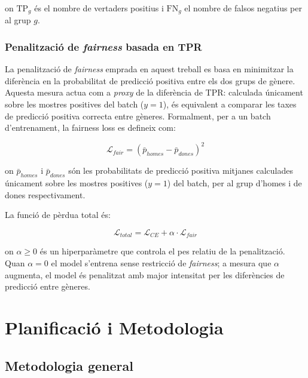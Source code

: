 \documentclass[a4paper,12pt,twoside]{ThesisStyle}
\begin{document}
\noindent on $\text{TP}_g$ és el nombre de vertaders positius i $\text{FN}_g$ el nombre de falsos negatius per al grup $g$.

\subsection{Penalització de \textit{fairness} basada en TPR}

La penalització de \textit{fairness} emprada en aquest treball es basa en minimitzar la diferència en la probabilitat de predicció positiva entre els dos grups de gènere. Aquesta mesura actua com a \textit{proxy} de la diferència de TPR: calculada únicament sobre les mostres positives del batch ($y=1$), és equivalent a comparar les taxes de predicció positiva correcta entre gèneres. Formalment, per a un batch d'entrenament, la fairness loss es defineix com:

\begin{equation}
    \mathcal{L}_{fair} = \left( \bar{p}_{homes} - \bar{p}_{dones} \right)^2
    \label{equ:fairloss}
\end{equation}

\noindent on $\bar{p}_{homes}$ i $\bar{p}_{dones}$ són les probabilitats de predicció positiva mitjanes calculades únicament sobre les mostres positives ($y=1$) del batch, per al grup d'homes i de dones respectivament.

La funció de pèrdua total és:

\begin{equation}
    \mathcal{L}_{total} = \mathcal{L}_{CE} + \alpha \cdot \mathcal{L}_{fair}
    \label{equ:totalloss}
\end{equation}

\noindent on $\alpha \geq 0$ és un hiperparàmetre que controla el pes relatiu de la penalització. Quan $\alpha = 0$ el model s'entrena sense restricció de \textit{fairness}; a mesura que $\alpha$ augmenta, el model és penalitzat amb major intensitat per les diferències de predicció entre gèneres.


\chapter{Planificació i Metodologia}
\label{cap:plan}

\section{Metodologia general}
\end{document}
